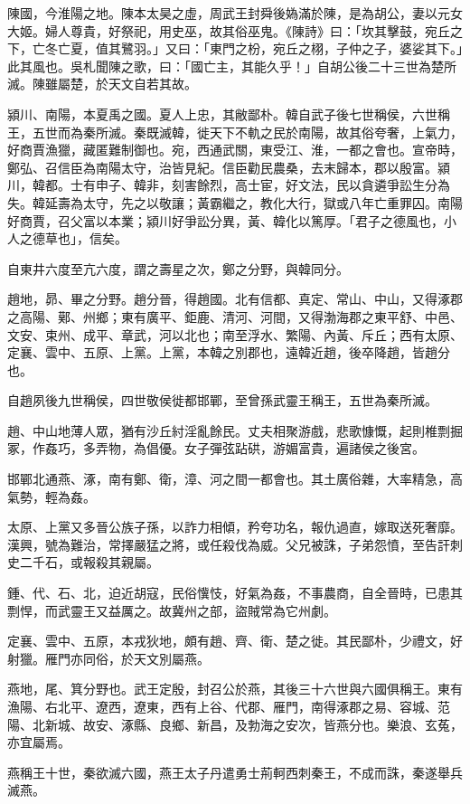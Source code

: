 \begin{pinyinscope}
陳國，今淮陽之地。陳本太昊之虛，周武王封舜後媯滿於陳，是為胡公，妻以元女大姬。婦人尊貴，好祭祀，用史巫，故其俗巫鬼。《陳詩》曰：「坎其擊鼓，宛丘之下，亡冬亡夏，值其鷺羽。」又曰：「東門之枌，宛丘之栩，子仲之子，婆娑其下。」此其風也。吳札聞陳之歌，曰：「國亡主，其能久乎！」自胡公後二十三世為楚所滅。陳雖屬楚，於天文自若其故。

潁川、南陽，本夏禹之國。夏人上忠，其敝鄙朴。韓自武子後七世稱侯，六世稱王，五世而為秦所滅。秦既滅韓，徙天下不軌之民於南陽，故其俗夸奢，上氣力，好商賈漁獵，藏匿難制御也。宛，西通武關，東受江、淮，一都之會也。宣帝時，鄭弘、召信臣為南陽太守，治皆見紀。信臣勸民農桑，去末歸本，郡以殷富。潁川，韓都。士有申子、韓非，刻害餘烈，高士宦，好文法，民以貪遴爭訟生分為失。韓延壽為太守，先之以敬讓；黃霸繼之，教化大行，獄或八年亡重罪囚。南陽好商賈，召父富以本業；潁川好爭訟分異，黃、韓化以篤厚。「君子之德風也，小人之德草也」，信矣。

自東井六度至亢六度，謂之壽星之次，鄭之分野，與韓同分。

趙地，昴、畢之分野。趙分晉，得趙國。北有信都、真定、常山、中山，又得涿郡之高陽、鄚、州鄉；東有廣平、鉅鹿、清河、河間，又得渤海郡之東平舒、中邑、文安、束州、成平、章武，河以北也；南至浮水、繁陽、內黃、斥丘；西有太原、定襄、雲中、五原、上黨。上黨，本韓之別郡也，遠韓近趙，後卒降趙，皆趙分也。

自趙夙後九世稱侯，四世敬侯徙都邯鄲，至曾孫武靈王稱王，五世為秦所滅。

趙、中山地薄人眾，猶有沙丘紂淫亂餘民。丈夫相聚游戲，悲歌慷慨，起則椎剽掘冢，作姦巧，多弄物，為倡優。女子彈弦跕硔，游媚富貴，遍諸侯之後宮。

邯鄲北通燕、涿，南有鄭、衛，漳、河之間一都會也。其土廣俗雜，大率精急，高氣勢，輕為姦。

太原、上黨又多晉公族子孫，以詐力相傾，矜夸功名，報仇過直，嫁取送死奢靡。漢興，號為難治，常擇嚴猛之將，或任殺伐為威。父兄被誅，子弟怨憤，至告訐刺史二千石，或報殺其親屬。

鍾、代、石、北，迫近胡寇，民俗懻忮，好氣為姦，不事農商，自全晉時，已患其剽悍，而武靈王又益厲之。故冀州之部，盜賊常為它州劇。

定襄、雲中、五原，本戎狄地，頗有趙、齊、衛、楚之徙。其民鄙朴，少禮文，好射獵。雁門亦同俗，於天文別屬燕。

燕地，尾、箕分野也。武王定殷，封召公於燕，其後三十六世與六國俱稱王。東有漁陽、右北平、遼西，遼東，西有上谷、代郡、雁門，南得涿郡之易、容城、范陽、北新城、故安、涿縣、良鄉、新昌，及勃海之安次，皆燕分也。樂浪、玄菟，亦宜屬焉。

燕稱王十世，秦欲滅六國，燕王太子丹遣勇士荊軻西刺秦王，不成而誅，秦遂舉兵滅燕。


\end{pinyinscope}
